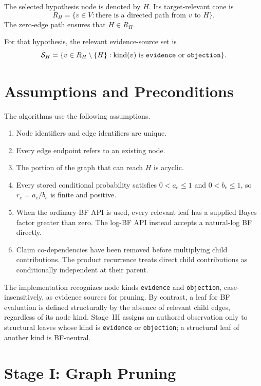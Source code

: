 \documentclass[11pt]{article}
\begin{document}
The selected hypothesis node is denoted by \(H\).  Its target-relevant cone is
\[
    R_H
      = \{v\in V : \text{there is a directed path from \(v\) to \(H\)}\}.
\]
The zero-edge path ensures that \(H\in R_H\).

For that hypothesis, the relevant evidence-source set is
\[
    \mathcal{S}_H
      = \{v\in R_H\setminus\{H\} :
           \operatorname{kind}(v)\text{ is \texttt{evidence} or
           \texttt{objection}}\}.
\]

\section{Assumptions and Preconditions}

The algorithms use the following assumptions.

\begin{enumerate}
    \item Node identifiers and edge identifiers are unique.
    \item Every edge endpoint refers to an existing node.
    \item The portion of the graph that can reach \(H\) is acyclic.
    \item Every stored conditional probability satisfies
          \(0<a_e\leq 1\) and \(0<b_e\leq 1\), so \(r_e=a_e/b_e\)
          is finite and positive.
    \item When the ordinary-BF API is used, every relevant leaf has a supplied
          Bayes factor greater than zero.  The log-BF API instead accepts a
          natural-log BF directly.
    \item Claim co-dependencies have been removed before multiplying child
          contributions.  The product recurrence treats direct child
          contributions as conditionally independent at their parent.
\end{enumerate}

The implementation recognizes node kinds \texttt{evidence} and
\texttt{objection}, case-insensitively, as evidence sources for pruning.
By contrast, a leaf for BF evaluation is defined structurally by the absence
of relevant child edges, regardless of its node kind.  Stage~III assigns an
authored observation only to structural leaves whose kind is
\texttt{evidence} or \texttt{objection}; a structural leaf of another kind is
BF-neutral.

\section{Stage I: Graph Pruning}
\end{document}
